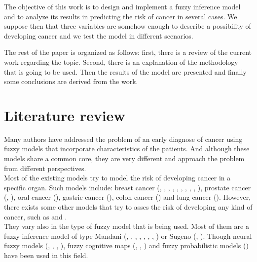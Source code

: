 \documentclass[conference]{IEEEtran}
\begin{document}
The objective of this work is to design and implement a fuzzy inference model and to analyze its results in predicting the risk of cancer in several cases. We suppose then that three variables are somehow enough to describe a possibility of developing cancer and we test the model in different scenarios.

The rest of the paper is organized as follows: first, there is a review of the current work regarding the topic. Second, there is an explanation of the methodology that is going to be used. Then the results of the model are presented and finally some conclusions are derived from the work.

\section{Literature review}
Many authors have addressed the problem of an early diagnose of cancer using fuzzy models that incorporate characteristics of the patients. And although these models share a common core, they are very different and approach the problem from different perspectives. \\

Most of the existing models try to model the risk of developing cancer in a specific organ. Such models include: breast cancer (\cite{Balanica2011}, \cite{Buyukavcu2016},
\cite{Gayathri2016},
\cite{Khezri2014},
\cite{Latha2013},
\cite{Papageorgiou2015},
\cite{Shleeg2013},
\cite{Subramanian2015},
\cite{Tatari2012},
\cite{Yilmaz2011}), prostate cancer (\cite{Benecchi2006},
\cite{Cosma2016}), oral cancer (\cite{Dom2012}), gastric cancer (\cite{Safdari2018}), colon cancer (\cite{Brand2006}) and lung cancer (\cite{Ylmaz2016}). However, there exists some other models that try to asses the risk of developing any kind of cancer, such as \cite{Atnccedil2012} and \cite{Dudek2012}. \\

They vary also in the type of fuzzy model that is being used. Most of them are a fuzzy inference model of type Mandani (\cite{Balanica2011}, \cite{Dudek2012}, \cite{Brand2006}, \cite{Gayathri2016}, \cite{Khezri2014}, \cite{Latha2013}, \cite{Safdari2018},
\cite{Yilmaz2011}) or Sugeno (\cite{Atnccedil2012},
\cite{Shleeg2013}). Though neural fuzzy models (\cite{Benecchi2006},
\cite{Dom2012},
\cite{Cosma2016},
\cite{Ylmaz2016}), fuzzy cognitive maps (\cite{Buyukavcu2016},
\cite{Papageorgiou2015},
\cite{Subramanian2015}) and fuzzy probabilistic models (\cite{Tatari2012}) have been used in this field. \\
\end{document}
